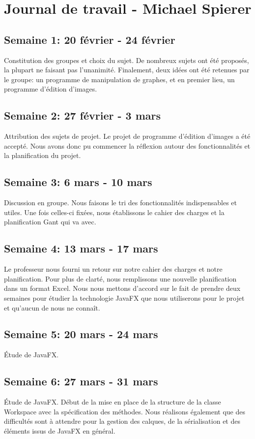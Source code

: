 \section{Journal de travail - Michael Spierer}

\subsection{Semaine 1: 20 février - 24 février}
Constitution des groupes et choix du sujet. De nombreux sujets ont été proposés, la plupart ne faisant pas l'unanimité. Finalement, deux idées ont été retenues par le groupe: un programme de manipulation de graphes, et en premier lieu, un programme d'édition d'images.
\subsection{Semaine 2: 27 février - 3 mars}
Attribution des sujets de projet. Le projet de programme d'édition d'images a été accepté. Nous avons donc pu commencer la réflexion autour des fonctionnalités et la planification du projet.
\subsection{Semaine 3: 6 mars - 10 mars}
Discussion en groupe. Nous faisons le tri des fonctionnalités indispensables et utiles. Une fois celles-ci fixées, nous établissons le cahier des charges et la planification Gant qui va avec.
\subsection{Semaine 4: 13 mars - 17 mars}
Le professeur nous fourni un retour sur notre cahier des charges et notre planification. Pour plus de clarté, nous remplissons une nouvelle planification dans un format Excel. Nous nous mettons d'accord sur le fait de prendre deux semaines pour étudier la technologie JavaFX que nous utiliserons pour le projet et qu'aucun de nous ne connaît.
\subsection{Semaine 5: 20 mars - 24 mars}
Étude de JavaFX.
\subsection{Semaine 6: 27 mars - 31 mars}
Étude de JavaFX. Début de la mise en place de la structure de la classe Workspace avec la spécification des méthodes. Nous réalisons également que des difficultés sont à attendre pour la gestion des calques, de la sérialisation et des éléments issus de JavaFX en général.
